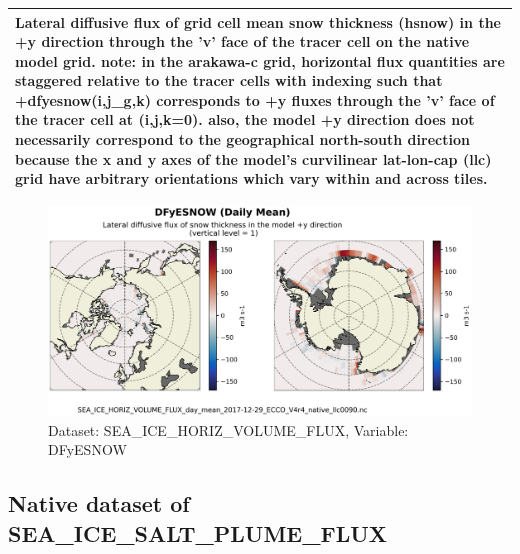 \begin{longtable}{|m{}|m{}|m{}|m{}|}
\multicolumn{4}{|p{1\textwidth}|}{\footnotesize{{Lateral diffusive flux of grid cell mean snow thickness (hsnow) in the +y direction through the 'v' face of the tracer cell on the native model grid. note: in the arakawa-c grid, horizontal flux quantities are staggered relative to the tracer cells with indexing such that +dfyesnow(i,j\_g,k) corresponds to +y fluxes through the 'v' face of the tracer cell at (i,j,k=0). also, the model +y direction does not necessarily correspond to the geographical north-south direction because the x and y axes of the model's curvilinear lat-lon-cap (llc) grid have arbitrary orientations which vary within and across tiles.}}} \\ \hline
\end{longtable}

\begin{figure}[H]
\centering
\includegraphics[scale=0.55]{../images/plots/native_plots/Sea-Ice_and_Snow_Horizontal_Volume_Fluxes/DFyESNOW.png}
\caption{Dataset: SEA\_ICE\_HORIZ\_VOLUME\_FLUX, Variable: DFyESNOW}
\label{tab:table-SEA_ICE_HORIZ_VOLUME_FLUX_DFyESNOW-Plot}
\end{figure}
\newpage
\subsection{Native dataset of SEA\_ICE\_SALT\_PLUME\_FLUX}
\newp
